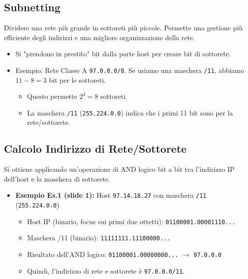 \documentclass{article}
\begin{document}
\subsection{Subnetting}
Dividere una rete più grande in sottoreti più piccole. Permette una gestione più efficiente degli indirizzi e una migliore organizzazione della rete.
\begin{itemize}
    \item Si "prendono in prestito" bit dalla parte host per creare bit di sottorete.
    \item Esempio: Rete Classe A \texttt{97.0.0.0/8}. Se usiamo una maschera \texttt{/11}, abbiamo $11 - 8 = 3$ bit per le sottoreti.
    \begin{itemize}
        \item Questo permette $2^3 = 8$ sottoreti.
        \item La maschera \texttt{/11} (\texttt{255.224.0.0}) indica che i primi 11 bit sono per la rete/sottorete.
    \end{itemize}
\end{itemize}

\subsection{Calcolo Indirizzo di Rete/Sottorete}
Si ottiene applicando un'operazione di AND logico bit a bit tra l'indirizzo IP dell'host e la maschera di sottorete.
\begin{itemize}
    \item \textbf{Esempio Es.1 (slide 1):} Host \texttt{97.14.18.27} con maschera \texttt{/11} (\texttt{255.224.0.0})
    \begin{itemize}
        \item Host IP (binario, focus sui primi due ottetti): \texttt{01100001.00001110...}
        \item Maschera /11 (binario): \texttt{11111111.11100000...}
        \item Risultato dell'AND logico: \texttt{01100001.00000000...} $\rightarrow$ \texttt{97.0.0.0}
        \item Quindi, l'indirizzo di rete e sottorete è \texttt{97.0.0.0/11}.
    \end{itemize}
\end{itemize}
\end{document}
